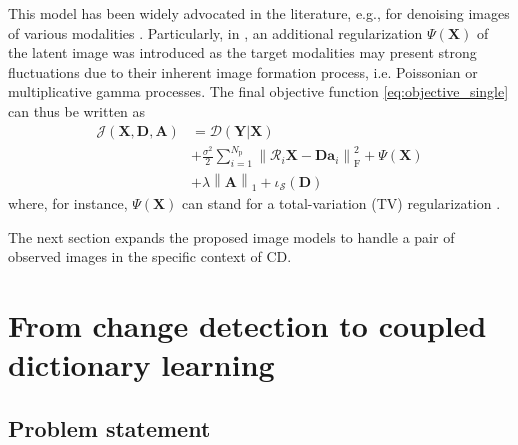 \documentclass[review]{elsarticle}
\newcommand{\Npatch}{N_{\mathrm{p}}}
\begin{document}
This model has been widely advocated in the literature, e.g., for denoising images of various modalities \citep{elad_image_2006,ma_dictionary_2013}. Particularly, in \citet{ma_dictionary_2013}, an additional regularization $\Psi\left(\mathbf{X}\right)$ of the latent image was introduced as the target modalities may present strong fluctuations due to their inherent image formation process, i.e. Poissonian or multiplicative gamma processes. The final objective function \eqref{eq:objective_single} can thus be written as
\begin{equation}
	\label{eq:objective_single_den}
	\begin{aligned}
  \mathcal{J}\left(\mathbf{X},\mathbf{D},\mathbf{A}\right) &=
  \mathcal{D}(\mathbf{Y}|\mathbf{X}) \\
  & + \frac{\sigma^{2}}{2}\sum_{i=1}^{\Npatch}\left\|\mathcal{R}_{{i}}\mathbf{X} - \mathbf{D}\mathbf{a}_{i}\right\|_{\mathrm{F}}^{2} + \Psi\left(\mathbf{X}\right) \\
  &+ \lambda \left\|\mathbf{A}\right\|_1 + \iota_{\mathcal{S}}(\mathbf{D})
	\end{aligned}
\end{equation}
where, for instance, $\Psi\left(\mathbf{X}\right)$ can stand for a total-variation (TV) regularization \citep{ma_dictionary_2013}.

The next section expands the proposed image models to handle a pair of observed images in the specific context of CD.

\section{From change detection to coupled dictionary learning}
\label{sec:DL}

\subsection{Problem statement}
\label{subsec:ps}
\end{document}
